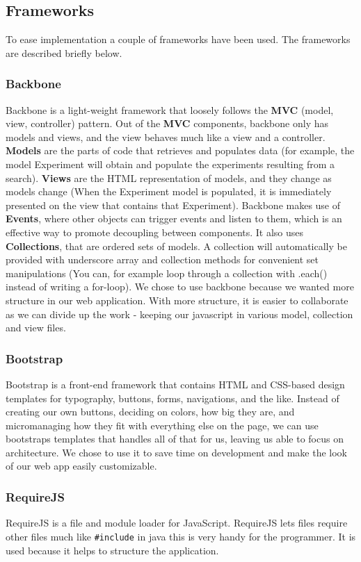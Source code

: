 \subsection{Frameworks}
\label{sec:web_frame}
To ease implementation a couple of frameworks have been used. The frameworks are described briefly below.
\subsubsection{Backbone}
Backbone\cite{web_1} is a light-weight framework that loosely follows the \textbf{MVC} (model, view, controller) pattern. Out of the \textbf{MVC} components, backbone only has models and views, and the view behaves much like a view and a controller. \textbf{Models} are the parts of code that retrieves and populates data (for example, the model Experiment will obtain and populate the experiments resulting from a search). \textbf{Views} are the HTML representation of models, and they change as models change (When the Experiment model is populated, it is immediately presented on the view that contains that Experiment).
Backbone makes use of \textbf{Events}, where other objects can trigger events and listen to them, which is an effective way to promote decoupling between components. It also uses \textbf{Collections}, that are ordered sets of models. A collection will automatically be provided with underscore array and collection methods for convenient set manipulations (You can, for example loop through a collection with .each() instead of writing a for-loop). We chose to use backbone because we wanted more structure in our web application. With more structure, it is easier to collaborate as we can divide up the work - keeping our javascript in various model, collection and view files.

\subsubsection{Bootstrap}
Bootstrap\cite{web_2} is a front-end framework that contains HTML and CSS-based design templates for typography, buttons, forms, navigations, and the like. Instead of creating our own buttons, deciding on colors, how big they are, and micromanaging how they fit with everything else on the page, we can use bootstraps templates that handles all of that for us, leaving us able to focus on architecture. We chose to use it to save time on development and make the look of our web app easily customizable.

\subsubsection{RequireJS}
RequireJS\cite{web_5} is a file and module loader for JavaScript. RequireJS lets files require other files much like \texttt{\#include} in java this is very handy for the programmer. It is used because it helps to structure the application.
